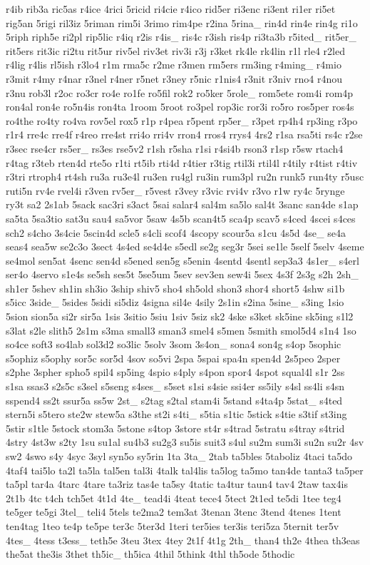 {r4ib rib3a ric5as r4ice 4rici 5ricid ri4cie r4ico rid5er ri3enc ri3ent ri1er ri5et rig5an 5rigi ril3iz 5riman rim5i 3rimo rim4pe r2ina 5rina\-\_\- rin4d rin4e rin4g ri1o 5riph riph5e ri2pl rip5lic r4iq r2is r4is\-\_\- ris4c r3ish ris4p ri3ta3b r5ited\-\_\- rit5er\-\_\- rit5ers rit3ic ri2tu rit5ur riv5el riv3et riv3i r3j r3ket rk4le rk4lin r1l rle4 r2led r4lig r4lis rl5ish r3lo4 r1m rma5c r2me r3men rm5ers rm3ing r4ming\-\_\- r4mio r3mit r4my r4nar r3nel r4ner r5net r3ney r5nic r1nis4 r3nit r3niv rno4 r4nou r3nu rob3l r2oc ro3cr ro4e ro1fe ro5fil rok2 ro5ker 5role\-\_\- rom5ete rom4i rom4p ron4al ron4e ro5n4is ron4ta 1room 5root ro3pel rop3ic ror3i ro5ro ros5per ros4s ro4the ro4ty ro4va rov5el rox5 r1p r4pea r5pent rp5er\-\_\- r3pet rp4h4 rp3ing r3po r1r4 rre4c rre4f r4reo rre4st rri4o rri4v rron4 rros4 rrys4 4rs2 r1sa rsa5ti rs4c r2se r3sec rse4cr rs5er\-\_\- rs3es rse5v2 r1sh r5sha r1si r4si4b rson3 r1sp r5sw rtach4 r4tag r3teb rten4d rte5o r1ti rt5ib rti4d r4tier r3tig rtil3i rtil4l r4tily r4tist r4tiv r3tri rtroph4 rt4sh ru3a ru3e4l ru3en ru4gl ru3in rum3pl ru2n runk5 run4ty r5usc ruti5n rv4e rvel4i r3ven rv5er\-\_\- r5vest r3vey r3vic rvi4v r3vo r1w ry4c 5rynge ry3t sa2 2s1ab 5sack sac3ri s3act 5sai salar4 sal4m sa5lo sal4t 3sanc san4de s1ap sa5ta 5sa3tio sat3u sau4 sa5vor 5saw 4s5b scan4t5 sca4p scav5 s4ced 4scei s4ces sch2 s4cho 3s4cie 5scin4d scle5 s4cli scof4 4scopy scour5a s1cu 4s5d 4se\-\_\- se4a seas4 sea5w se2c3o 3sect 4s4ed se4d4e s5edl se2g seg3r 5sei se1le 5self 5selv 4seme se4mol sen5at 4senc sen4d s5ened sen5g s5enin 4sentd 4sentl sep3a3 4s1er\-\_\- s4erl ser4o 4servo s1e4s se5sh ses5t 5se5um 5sev sev3en sew4i 5sex 4s3f 2s3g s2h 2sh\-\_\- sh1er 5shev sh1in sh3io 3ship shiv5 sho4 sh5old shon3 shor4 short5 4shw si1b s5icc 3side\-\_\- 5sides 5sidi si5diz 4signa sil4e 4sily 2s1in s2ina 5sine\-\_\- s3ing 1sio 5sion sion5a si2r sir5a 1sis 3sitio 5siu 1siv 5siz sk2 4ske s3ket sk5ine sk5ing s1l2 s3lat s2le slith5 2s1m s3ma small3 sman3 smel4 s5men 5smith smol5d4 s1n4 1so so4ce soft3 so4lab sol3d2 so3lic 5solv 3som 3s4on\-\_\- sona4 son4g s4op 5sophic s5ophiz s5ophy sor5c sor5d 4sov so5vi 2spa 5spai spa4n spen4d 2s5peo 2sper s2phe 3spher spho5 spil4 sp5ing 4spio s4ply s4pon spor4 4spot squal4l s1r 2ss s1sa ssas3 s2s5c s3sel s5seng s4ses\-\_\- s5set s1si s4sie ssi4er ss5ily s4sl ss4li s4sn sspend4 ss2t ssur5a ss5w 2st\-\_\- s2tag s2tal stam4i 5stand s4ta4p 5stat\-\_\- s4ted stern5i s5tero ste2w stew5a s3the st2i s4ti\-\_\- s5tia s1tic 5stick s4tie s3tif st3ing 5stir s1tle 5stock stom3a 5stone s4top 3store st4r s4trad 5stratu s4tray s4trid 4stry 4st3w s2ty 1su su1al su4b3 su2g3 su5is suit3 s4ul su2m sum3i su2n su2r 4sv sw2 4swo s4y 4syc 3syl syn5o sy5rin 1ta 3ta\-\_\- 2tab ta5bles 5taboliz 4taci ta5do 4taf4 tai5lo ta2l ta5la tal5en tal3i 4talk tal4lis ta5log ta5mo tan4de tanta3 ta5per ta5pl tar4a 4tarc 4tare ta3riz tas4e ta5sy 4tatic ta4tur taun4 tav4 2taw tax4is 2t1b 4tc t4ch tch5et 4t1d 4te\-\_\- tead4i 4teat tece4 5tect 2t1ed te5di 1tee teg4 te5ger te5gi 3tel\-\_\- teli4 5tels te2ma2 tem3at 3tenan 3tenc 3tend 4tenes 1tent ten4tag 1teo te4p te5pe ter3c 5ter3d 1teri ter5ies ter3is teri5za 5ternit ter5v 4tes\-\_\- 4tess t3ess\-\_\- teth5e 3teu 3tex 4tey 2t1f 4t1g 2th\-\_\- than4 th2e 4thea th3eas the5at the3is 3thet th5ic\-\_\- th5ica 4thil 5think 4thl th5ode 5thodic }

